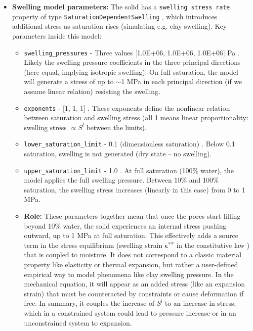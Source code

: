 \documentclass[10pt,a4paper]{article}
\begin{document}
\begin{itemize}
    \item \textbf{Swelling model parameters:} The solid has a \texttt{swelling stress rate} property of type \texttt{SaturationDependentSwelling} \cite{file:04_media_TRM, file:trm_medium_phase_prop}, which introduces additional stress as saturation rises (simulating e.g. clay swelling). Key parameters inside this model:
    \begin{itemize}
        \item \texttt{swelling\_pressures} - Three values [1.0E+06, 1.0E+06, 1.0E+06] Pa \cite{file:04_media_TRM}. Likely the swelling pressure coefficients in the three principal directions (here equal, implying isotropic swelling). On full saturation, the model will generate a stress of up to $\sim$1 MPa in each principal direction (if we assume linear relation) resisting the swelling.
        \item \texttt{exponents} - [1, 1, 1] \cite{file:04_media_TRM}. These exponents define the nonlinear relation between saturation and swelling stress (all 1 means linear proportionality: swelling stress $\propto S^l$ between the limits).
        \item \texttt{lower\_saturation\_limit} - 0.1 (dimensionless saturation) \cite{file:04_media_TRM}. Below 0.1 saturation, swelling is not generated (dry state – no swelling).
        \item \texttt{upper\_saturation\_limit} - 1.0 \cite{file:04_media_TRM}. At full saturation (100\% water), the model applies the full swelling pressure. Between 10\% and 100\% saturation, the swelling stress increases (linearly in this case) from 0 to 1 MPa.
        \item \textbf{Role:} These parameters together mean that once the pores start filling beyond 10\% water, the solid experiences an internal stress pushing outward, up to 1 MPa at full saturation. This effectively adds a source term in the stress equilibrium (swelling strain $\dot{\boldsymbol{\epsilon}}^{sw}$ in the constitutive law \cite{ogs:trm}) that is coupled to moisture. It does not correspond to a classic material property like elasticity or thermal expansion, but rather a user-defined empirical way to model phenomena like clay swelling pressure. In the mechanical equation, it will appear as an added stress (like an expansion strain) that must be counteracted by constraints or cause deformation if free. In summary, it couples the increase of $S^l$ to an increase in stress, which in a constrained system could lead to pressure increase or in an unconstrained system to expansion.
    \end{itemize}
\end{itemize}
\end{document}
